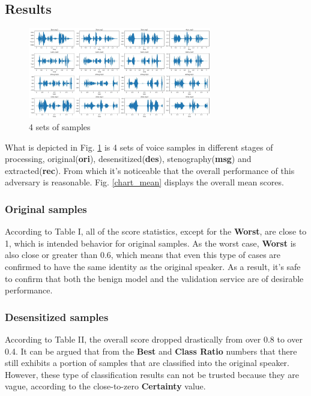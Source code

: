 \documentclass[journal]{IEEEtran} %
\begin{document}
\subsection{Results}

\begin{figure}[htbp]
    \centerline{\includegraphics[width=8cm]{samp_wav.jpg}}
    \caption{4 sets of samples}
    \label{samp1}
\end{figure}

What is depicted in Fig. \ref{samp1} is 4 sets of voice samples in different stages of processing, original(\textbf{ori}), desensitized(\textbf{des}), stenography(\textbf{msg}) and extracted(\textbf{rec}). From which it's noticeable that the overall performance of this adversary is reasonable. Fig. \ref{chart_mean} displays the overall mean scores.
\subsubsection{Original samples}

According to Table I, all of the score statistics, except for the \textbf{Worst}, are close to 1, which is intended behavior for original samples. As the worst case, \textbf{Worst} is also close or greater than 0.6, which means that even this type of cases are confirmed to have the same identity as the original speaker. As a result, it's safe to confirm that both the benign model and the validation service are of desirable performance.

\subsubsection{Desensitized samples}

According to Table II, the overall score dropped drastically from over 0.8 to over 0.4. It can be argued that from the \textbf{Best} and \textbf{Class Ratio} numbers that there still exhibits a portion of samples that are classified into the original speaker. However, these type of classification results can not be trusted because they are vague, according to the close-to-zero \textbf{Certainty} value.
\end{document}

